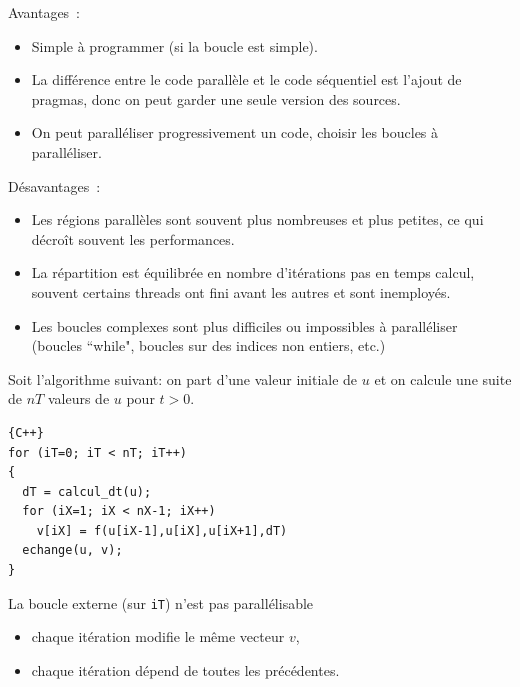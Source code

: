 \documentclass{beamer}
\begin{document}
\begin{frame}
	Avantages~:
	\begin{itemize}
		\item Simple à programmer (si la boucle est simple).
		
		\item La différence entre le code parallèle et le code séquentiel est l'ajout de pragmas, donc on peut garder une seule version des sources.
		
		\item On peut paralléliser progressivement un code, choisir les boucles à paralléliser.
	\end{itemize}

\vfill

	Désavantages~:
	\begin{itemize}
		\item Les régions parallèles sont souvent plus nombreuses et plus petites, ce qui décroît souvent les performances.
		\item La répartition est équilibrée en nombre d'itérations pas en temps calcul, souvent certains threads ont fini avant les autres et sont inemployés.
		\item Les boucles complexes sont plus difficiles ou impossibles à paralléliser (boucles ``while", boucles sur des indices non entiers, etc.)
	\end{itemize}
\end{frame}

\begin{frame}[fragile]
	Soit l'algorithme suivant: on part d'une valeur initiale de $u$ et on calcule une suite de $nT$ valeurs de $u$ pour $t > 0$.
	
	
	\begin{lstlisting}{C++}
for (iT=0; iT < nT; iT++)
{
  dT = calcul_dt(u);
  for (iX=1; iX < nX-1; iX++)
    v[iX] = f(u[iX-1],u[iX],u[iX+1],dT)
  echange(u, v);
}
	\end{lstlisting}
	
	\vfill
	La boucle externe (sur \verb|iT|) n'est pas parallélisable
	\begin{itemize}
		\item chaque itération modifie le même vecteur $v$,
		\item chaque itération dépend de toutes les précédentes.
	\end{itemize}
\end{frame}
\end{document}
